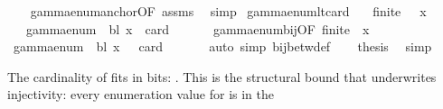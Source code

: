 \begin{isabellebody}
%
\isadelimproof
\ \ %
\endisadelimproof
%
\isatagproof
{}\isamarkupfalse%
\ gamma{\isacharunderscore}{\kern0pt}enum{\isacharunderscore}{\kern0pt}anchor{\isacharbrackleft}{\kern0pt}OF\ assms{\isacharbrackright}{\kern0pt}\ \isamarkupfalse%
\ simp%
\endisatagproof
{\isafoldproof}%
%
\isadelimproof
\isanewline
%
\endisadelimproof
\isanewline
{}\isamarkupfalse%
\ gamma{\isacharunderscore}{\kern0pt}enum{\isacharunderscore}{\kern0pt}lt{\isacharunderscore}{\kern0pt}card{\isacharcolon}{\kern0pt}\isanewline
\ \ \ {\isachardoublequoteopen}finite\ {\isasymGamma}{\isachardoublequoteclose}\ \ {\isachardoublequoteopen}x\ {\isasymin}\ {\isasymGamma}{\isachardoublequoteclose}\isanewline
\ \ \ {\isachardoublequoteopen}gamma{\isacharunderscore}{\kern0pt}enum\ {\isasymGamma}\ bl\ x\ {\isacharless}{\kern0pt}\ card\ {\isasymGamma}{\isachardoublequoteclose}\isanewline
%
\isadelimproof
%
\endisadelimproof
%
\isatagproof
{}\isamarkupfalse%
\ {\isacharminus}{\kern0pt}\isanewline
\ \ \isamarkupfalse%
\ gamma{\isacharunderscore}{\kern0pt}enum{\isacharunderscore}{\kern0pt}bij{\isacharbrackleft}{\kern0pt}OF\ {\isacartoucheopen}finite\ {\isasymGamma}{\isacartoucheclose}{\isacharbrackright}{\kern0pt}\ {\isacartoucheopen}x\ {\isasymin}\ {\isasymGamma}{\isacartoucheclose}\isanewline
\ \ \isamarkupfalse%
\ {\isachardoublequoteopen}gamma{\isacharunderscore}{\kern0pt}enum\ {\isasymGamma}\ bl\ x\ {\isasymin}\ {\isacharbraceleft}{\kern0pt}{\isachardot}{\kern0pt}{\isachardot}{\kern0pt}{\isacharless}{\kern0pt}\ card\ {\isasymGamma}{\isacharbraceright}{\kern0pt}{\isachardoublequoteclose}\isanewline
\ \ \ \ \isamarkupfalse%
\ {\isacharparenleft}{\kern0pt}auto\ simp{\isacharcolon}{\kern0pt}\ bij{\isacharunderscore}{\kern0pt}betw{\isacharunderscore}{\kern0pt}def{\isacharparenright}{\kern0pt}\isanewline
\ \ \isamarkupfalse%
\ {\isacharquery}{\kern0pt}thesis\ \isamarkupfalse%
\ simp\isanewline
{}\isamarkupfalse%
%
\endisatagproof
{\isafoldproof}%
%
\isadelimproof
%
\endisadelimproof
%
\begin{isamarkuptext}%
The cardinality of \isa{{\isasymGamma}} fits in  bits:
  .  This is the structural
  bound that underwrites injectivity: every enumeration value
   for  is in the

\end{isamarkuptext}
\end{isabellebody}

